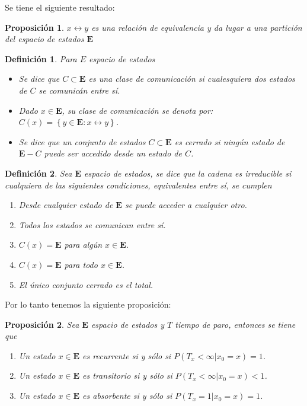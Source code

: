 \documentclass{article}
\newtheorem{Def}{Definición}[section]
\newtheorem{Prop}{Proposición}%
\newcommand{\Eb}{\mathbf{E}}
\numberwithin{equation}{section}
\begin{document}
Se tiene el siguiente resultado:

\begin{Prop}
$x\leftrightarrow y$ es una relaci\'on de equivalencia y da lugar a una partici\'on del espacio de estados $\Eb$
\end{Prop}

\begin{Def}
Para $E$ espacio de estados
\begin{itemize}

\item[a)  ] Se dice que $C\subset \Eb$ es una clase de comunicaci\'on si cualesquiera dos estados de $C$ se comunic\'an entre s\'i.

\item[b)  ] Dado $x\in\Eb$, su clase de comunicaci\'on se denota por: $C\left(x\right)=\left\{y\in\Eb:x\leftrightarrow y\right\}$.

\item[c)  ] Se dice que un conjunto de estados  $C\subset \Eb$ es cerrado si ning\'un estado de $\Eb-C$ puede ser accedido desde un estado de $C$.
\end{itemize}
\end{Def}


\begin{Def}
Sea $\Eb$ espacio de estados, se dice que la cadena es irreducible si cualquiera de las siguientes condiciones, equivalentes entre s\'i,  se cumplen
\begin{enumerate}
\item[a) ] Desde cualquier estado de $\Eb$ se puede acceder a cualquier otro.

\item[b) ] Todos los estados se comunican entre s\'i.

\item[c) ] $C\left(x\right)=\Eb$ para alg\'un $x\in\Eb$.

\item[d) ] $C\left(x\right)=\Eb$ para todo $x\in\Eb$.

\item[e) ] El \'unico conjunto cerrado es el total.
\end{enumerate}
\end{Def}
Por lo tanto tenemos la siguiente proposici\'on:
\begin{Prop}  Sea $\Eb$ espacio de estados y $T$ tiempo de paro, entonces se tiene que
\begin{enumerate}
\item[a) ] Un estado $x\in\Eb$ es recurrente si y s\'olo si $P\left(T_{x}<\infty|x_{0}=x\right)=1$.

\item[b) ] Un estado $x\in\Eb$ es transitorio si y s\'olo si $P\left(T_{x}<\infty|x_{0}=x\right)<1$.

\item[c) ] Un estado $x\in\Eb$ es absorbente si y s\'olo si $P\left(T_{x}=1|x_{0}=x\right)=1$.


\end{enumerate}
\end{Prop}
\end{document}
